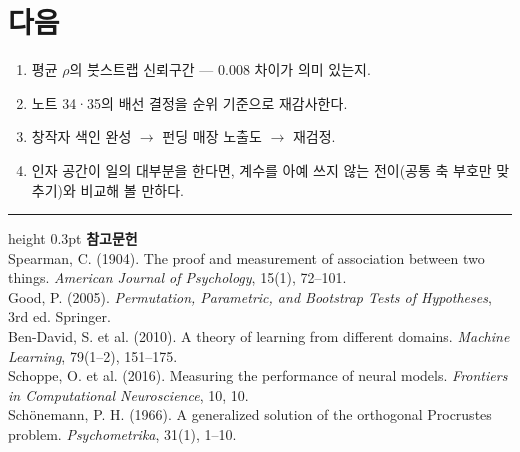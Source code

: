 \documentclass[10pt]{article}
\begin{document}
\section{다음}

\begin{enumerate}[leftmargin=1.3em,itemsep=0.15em]
\item 평균 $\rho$의 붓스트랩 신뢰구간 --- 0.008 차이가 의미 있는지.
\item 노트 34·35의 배선 결정을 순위 기준으로 재감사한다.
\item 창작자 색인 완성 $\to$ 펀딩 매장 노출도 $\to$ 재검정.
\item 인자 공간이 일의 대부분을 한다면, 계수를 아예 쓰지 않는 전이(공통 축
      부호만 맞추기)와 비교해 볼 만하다.
\end{enumerate}

\vspace{0.6em}
\hrule height 0.3pt
\vspace{0.5em}
{\footnotesize
\textbf{참고문헌}\\[0.3em]
Spearman, C. (1904). The proof and measurement of association between two things.
\emph{American Journal of Psychology}, 15(1), 72--101.\\[0.15em]
Good, P. (2005). \emph{Permutation, Parametric, and Bootstrap Tests of
Hypotheses}, 3rd ed. Springer.\\[0.15em]
Ben-David, S. et al. (2010). A theory of learning from different domains.
\emph{Machine Learning}, 79(1--2), 151--175.\\[0.15em]
Schoppe, O. et al. (2016). Measuring the performance of neural models.
\emph{Frontiers in Computational Neuroscience}, 10, 10.\\[0.15em]
Schönemann, P. H. (1966). A generalized solution of the orthogonal Procrustes
problem. \emph{Psychometrika}, 31(1), 1--10.
}
\end{document}

